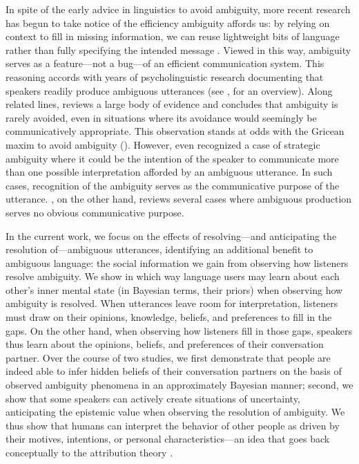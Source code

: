 \documentclass[11pt,a4paper]{article}
\begin{document}
In spite of the early advice in linguistics to avoid ambiguity, more recent research has begun to take notice of the efficiency ambiguity affords us: by relying on context to fill in missing information, we can reuse lightweight bits of language rather than fully specifying the intended message \cite{levinson2000,piantadosietal2012,wasow2015}. 
Viewed in this way, ambiguity serves as a feature---not a bug---of an efficient communication system.
This reasoning accords with years of psycholinguistic research documenting that speakers readily produce ambiguous utterances (see , for an overview). 
Along related lines,  reviews a large body of evidence and concludes that ambiguity is rarely avoided, even in situations where its avoidance would seemingly be communicatively appropriate.
This observation stands at odds with the Gricean maxim to avoid ambiguity ().
However, even \citeauthor{grice1975} recognized a case of strategic ambiguity where it could be the intention of the speaker to communicate more than one possible interpretation afforded by an ambiguous utterance.
In such cases, recognition of the ambiguity serves as the communicative purpose of the utterance.
, on the other hand, reviews several cases where ambiguous production serves no obvious communicative purpose.


In the current work, we focus on the effects of resolving---and anticipating the resolution of---ambiguous utterances, identifying an additional benefit to ambiguous language: the social information we gain from observing how listeners resolve ambiguity.
We show in which way language users may learn about each other's inner mental state (in Bayesian terms, their priors) when observing how ambiguity is resolved. 
When utterances leave room for interpretation, listeners must draw on their opinions, knowledge, beliefs, and preferences to fill in the gaps.
On the other hand, when observing how listeners fill in those gaps, speakers thus learn about the opinions, beliefs, and preferences of their conversation partner. 
Over the course of two studies, we first demonstrate that people are indeed able to infer hidden beliefs of their conversation partners on the basis of observed ambiguity phenomena in an approximately Bayesian manner;
second, we show that some speakers can actively create situations of uncertainty, anticipating the epistemic value when observing the resolution of ambiguity. 
We thus show that humans can interpret the behavior of other people as driven by their motives, intentions, or personal characteristics---an idea that goes back conceptually to the attribution theory \cite{jones1965acts, kelley1967attribution, kelley1970social}.
\end{document}
